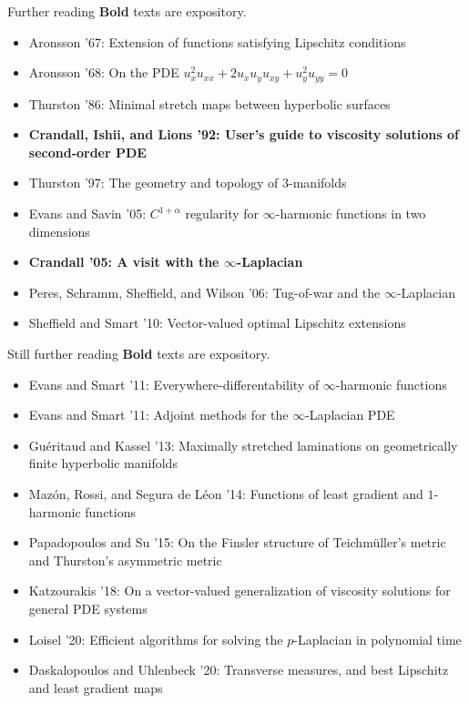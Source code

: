 \documentclass[10pt]{beamer}
\begin{document}
\begin{frame}{Further reading}
\textbf{Bold} texts are expository.
\begin{itemize}
\item Aronsson '67: Extension of functions satisfying Lipschitz conditions
\item Aronsson '68: On the PDE $u_x^2 u_{xx} + 2u_xu_yu_{xy} + u_y^2 u_{yy} = 0$
\item Thurston '86: Minimal stretch maps between hyperbolic surfaces 
\item \textbf{Crandall, Ishii, and Lions '92: User's guide to viscosity solutions of second-order PDE}
\item Thurston '97: The geometry and topology of $3$-manifolds
\item Evans and Savin '05: $C^{1+\alpha}$ regularity for $\infty$-harmonic functions in two dimensions
\item \textbf{Crandall '05: A visit with the $\infty$-Laplacian}
\item Peres, Schramm, Sheffield, and Wilson '06: Tug-of-war and the $\infty$-Laplacian
\item Sheffield and Smart '10: Vector-valued optimal Lipschitz extensions
\end{itemize}
\end{frame}

\begin{frame}{Still further reading}
\textbf{Bold} texts are expository.
\begin{itemize}
\item Evans and Smart '11: Everywhere-differentability of $\infty$-harmonic functions 
\item Evans and Smart '11: Adjoint methods for the $\infty$-Laplacian PDE
\item Gu\'eritaud and Kassel '13: Maximally stretched laminations on geometrically finite hyperbolic manifolds
\item Maz\'on, Rossi, and Segura de L\'eon '14: Functions of least gradient and $1$-harmonic functions
\item Papadopoulos and Su '15: On the Finsler structure of Teichm\"uller's metric and Thurston's asymmetric metric
\item Katzourakis '18: On a vector-valued generalization of viscosity solutions for general PDE systems
\item Loisel '20: Efficient algorithms for solving the $p$-Laplacian in polynomial time
\item Daskalopoulos and Uhlenbeck '20: Transverse measures, and best Lipschitz and least gradient maps 
\end{itemize}
\end{frame}
\end{document}
